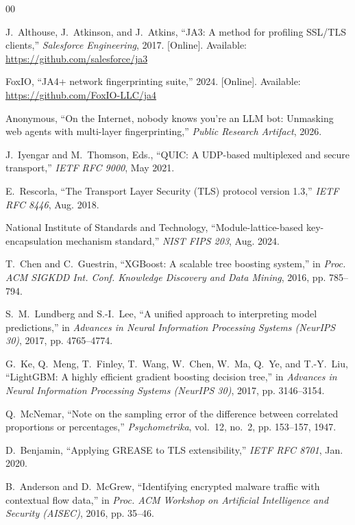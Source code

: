 \documentclass[conference]{IEEEtran}
\begin{document}
\begin{thebibliography}{00}

J.~Althouse, J.~Atkinson, and J.~Atkins, ``JA3: A method for profiling SSL/TLS clients,'' \emph{Salesforce Engineering}, 2017. [Online]. Available: \url{https://github.com/salesforce/ja3}

FoxIO, ``JA4+ network fingerprinting suite,'' 2024. [Online]. Available: \url{https://github.com/FoxIO-LLC/ja4}

Anonymous, ``On the Internet, nobody knows you're an LLM bot: Unmasking web agents with multi-layer fingerprinting,'' \emph{Public Research Artifact}, 2026.

J.~Iyengar and M.~Thomson, Eds., ``QUIC: A UDP-based multiplexed and secure transport,'' \emph{IETF RFC 9000}, May 2021.

E.~Rescorla, ``The Transport Layer Security (TLS) protocol version 1.3,'' \emph{IETF RFC 8446}, Aug. 2018.

National Institute of Standards and Technology, ``Module-lattice-based key-encapsulation mechanism standard,'' \emph{NIST FIPS 203}, Aug. 2024.

T.~Chen and C.~Guestrin, ``XGBoost: A scalable tree boosting system,'' in \emph{Proc. ACM SIGKDD Int. Conf. Knowledge Discovery and Data Mining}, 2016, pp. 785--794.

S.~M.~Lundberg and S.-I.~Lee, ``A unified approach to interpreting model predictions,'' in \emph{Advances in Neural Information Processing Systems (NeurIPS 30)}, 2017, pp. 4765--4774.

G.~Ke, Q.~Meng, T.~Finley, T.~Wang, W.~Chen, W.~Ma, Q.~Ye, and T.-Y.~Liu, ``LightGBM: A highly efficient gradient boosting decision tree,'' in \emph{Advances in Neural Information Processing Systems (NeurIPS 30)}, 2017, pp. 3146--3154.

Q.~McNemar, ``Note on the sampling error of the difference between correlated proportions or percentages,'' \emph{Psychometrika}, vol.~12, no.~2, pp. 153--157, 1947.

D.~Benjamin, ``Applying GREASE to TLS extensibility,'' \emph{IETF RFC 8701}, Jan. 2020.

B.~Anderson and D.~McGrew, ``Identifying encrypted malware traffic with contextual flow data,'' in \emph{Proc. ACM Workshop on Artificial Intelligence and Security (AISEC)}, 2016, pp. 35--46.


\end{thebibliography}
\end{document}
